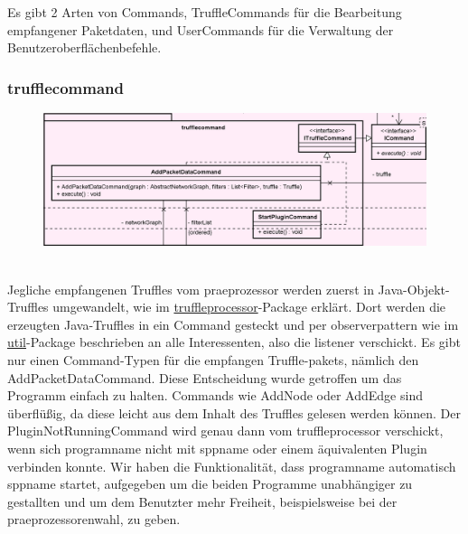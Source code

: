 Es gibt 2 Arten von Commands, TruffleCommands für die Bearbeitung empfangener
Paketdaten, und UserCommands für die Verwaltung der Benutzeroberflächenbefehle.

      \subsubsection{trufflecommand}
      \label{subsubsec:trufflecommand}
      \begin{figure}[H]
        \centering
        \includegraphics[width=\textwidth]{../diagramimages/trufflecommand.png}
        \caption{}\label{}
      \end{figure}
      \newline
      \newline
      Jegliche empfangenen Truffles vom \gls{praeprozessor} werden zuerst in Java-Objekt-Truffles umgewandelt, wie
      im \hyperref[subsubsec:truffleprocessor]{truffleprocessor}-Package erklärt. Dort
      werden die erzeugten Java-Truffles in ein Command gesteckt und per \gls{observerpattern}
      wie im \hyperref[subsec:util]{util}-Package beschrieben an alle Interessenten, also die \gls{listener} verschickt.
      \newline
      \newline
      Es gibt nur einen Command-Typen für die empfangen Truffle-\glspl{paket}, nämlich den
      AddPacketDataCommand. Diese Entscheidung wurde getroffen um das Programm einfach
      zu halten. Commands wie AddNode oder AddEdge sind überflüßig, da diese leicht aus
      dem Inhalt des Truffles gelesen werden können.
      \newline
      \newline
      Der PluginNotRunningCommand wird genau dann vom truffleprocessor verschickt, wenn sich \gls{programname}
      nicht mit \gls{sppname} oder einem äquivalenten Plugin verbinden konnte. Wir
      haben die Funktionalität, dass \gls{programname} automatisch \gls{sppname} startet,
      aufgegeben um die beiden Programme unabhängiger zu gestallten und um dem Benutzter
      mehr Freiheit, beispielsweise bei der \gls{praeprozessor}enwahl, zu geben.

